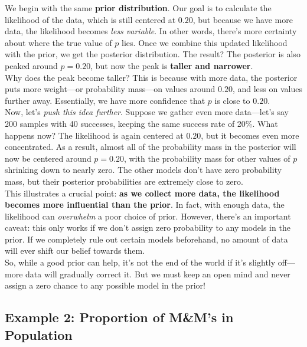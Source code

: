 We begin with the same \textbf{prior distribution}. Our goal is to calculate the likelihood of the data, which is still centered at \(0.20\), but because we have more data, the likelihood becomes \textit{less variable}. In other words, there's more certainty about where the true value of \(p\) lies. Once we combine this updated likelihood with the prior, we get the posterior distribution. The result? The posterior is also peaked around \(p = 0.20\), but now the peak is \textbf{taller and narrower}.\\

Why does the peak become taller? This is because with more data, the posterior puts more weight—or probability mass—on values around \(0.20\), and less on values further away. Essentially, we have more confidence that \(p\) is close to \(0.20\).\\

Now, let’s \textit{push this idea further}. Suppose we gather even more data—let's say 200 samples with 40 successes, keeping the same success rate of 20\%. What happens now? The likelihood is again centered at \(0.20\), but it becomes even more concentrated. As a result, almost all of the probability mass in the posterior will now be centered around \(p = 0.20\), with the probability mass for other values of \(p\) shrinking down to nearly zero. The other models don’t have zero probability mass, but their posterior probabilities are extremely close to zero.\\

This illustrates a crucial point: \textbf{as we collect more data, the likelihood becomes more influential than the prior}. In fact, with enough data, the likelihood can \textit{overwhelm} a poor choice of prior. However, there’s an important caveat: this only works if we don’t assign zero probability to any models in the prior. If we completely rule out certain models beforehand, no amount of data will ever shift our belief towards them.\\

So, while a good prior can help, it’s not the end of the world if it's slightly off—more data will gradually correct it. But we must keep an open mind and never assign a zero chance to any possible model in the prior!

\subsection{Example 2: Proportion of M\&M's in Population}

